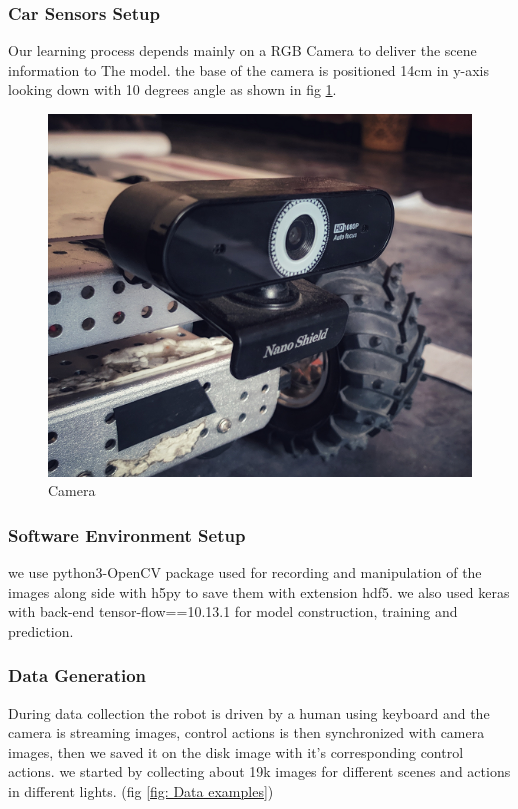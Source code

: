 \subsubsection{Car Sensors Setup}
\hspace{2cm} Our learning process depends mainly on a RGB Camera to deliver the scene information to The model.
the base of the camera is positioned 14cm in y-axis looking down with 10 degrees angle as shown in fig  \ref{fig: Camera}.

\begin{figure}%
    \center%
    \includegraphics[width=.6\textwidth]{images/Learningprocess/small.png}%
    \caption[Camera]{Camera}\label{fig: Camera}%
 \end{figure}
 
\subsubsection{Software Environment Setup}
   \hspace{2cm} we use python3-OpenCV package used  for recording and manipulation of the images along side with h5py to save them with extension hdf5.
    we also used keras with back-end tensor-flow==10.13.1 for model construction, training and prediction.
    
\subsubsection{Data Generation}
 \hspace{2cm}During data collection the robot is driven by a human using keyboard and the camera is streaming images, control actions is then synchronized with camera images, then we saved it on the disk image with it's corresponding control actions.
 we started by collecting about 19k images for different scenes and actions in different lights.
 (fig \ref{fig: Data examples})
 
